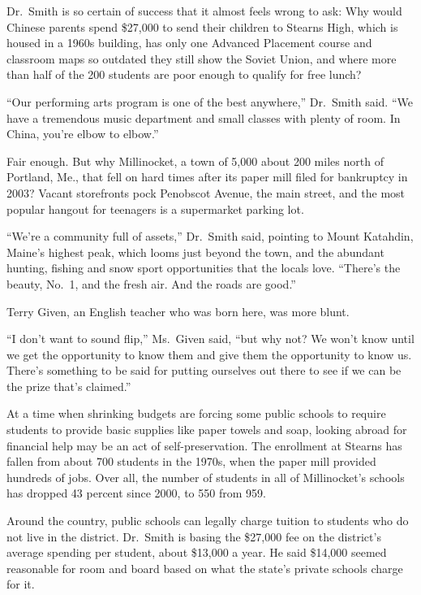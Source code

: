 ﻿\documentclass[12pt]{article}
\begin{document}
Dr.~Smith is so certain of success that it almost feels wrong to ask: Why would Chinese parents
spend \$27,000 to send their children to Stearns High, which is housed in a 1960s building, has only
one Advanced Placement course and classroom maps so outdated they still show the Soviet Union, and
where more than half of the 200 students are poor enough to qualify for free lunch?

``Our performing arts program is one of the best anywhere,'' Dr.~Smith said. ``We have a tremendous
music department and small classes with plenty of room. In China, you're elbow to elbow.''

Fair enough. But why Millinocket, a town of 5,000 about 200 miles north of Portland, Me., that fell
on hard times after its paper mill filed for bankruptcy in 2003? Vacant storefronts pock Penobscot
Avenue, the main street, and the most popular hangout for teenagers is a supermarket parking lot.

``We're a community full of assets,'' Dr.~Smith said, pointing to Mount Katahdin, Maine's highest
peak, which looms just beyond the town, and the abundant hunting, fishing and snow sport
opportunities that the locals love. ``There's the beauty, No.~1, and the fresh air. And the roads
are good.''

Terry Given, an English teacher who was born here, was more blunt.

``I don't want to sound flip,'' Ms.~Given said, ``but why not? We won't know until we get the
opportunity to know them and give them the opportunity to know us. There's something to be said for
putting ourselves out there to see if we can be the prize that's claimed.''

At a time when shrinking budgets are forcing some public schools to require students to provide
basic supplies like paper towels and soap, looking abroad for financial help may be an act of
self-preservation. The enrollment at Stearns has fallen from about 700 students in the 1970s, when
the paper mill provided hundreds of jobs. Over all, the number of students in all of Millinocket's
schools has dropped 43 percent since 2000, to 550 from 959.

Around the country, public schools can legally charge tuition to students who do not live in the
district. Dr.~Smith is basing the \$27,000 fee on the district's average spending per student, about
\$13,000 a year. He said \$14,000 seemed reasonable for room and board based on what the state's
private schools charge for it.
\end{document}
